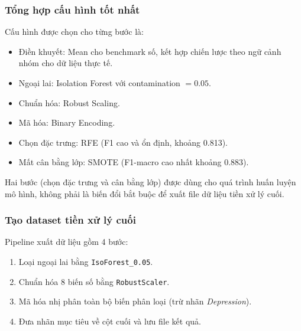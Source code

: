 \subsubsection{Tổng hợp cấu hình tốt nhất}
Cấu hình được chọn cho từng bước là:
\begin{itemize}
    \item Điền khuyết: Mean cho benchmark số, kết hợp chiến lược theo ngữ cảnh nhóm cho dữ liệu thực tế.
    \item Ngoại lai: Isolation Forest với contamination $=0.05$.
    \item Chuẩn hóa: Robust Scaling.
    \item Mã hóa: Binary Encoding.
    \item Chọn đặc trưng: RFE (F1 cao và ổn định, khoảng 0.813).
    \item Mất cân bằng lớp: SMOTE (F1-macro cao nhất khoảng 0.883).
\end{itemize}

Hai bước (chọn đặc trưng và cân bằng lớp) được dùng cho quá trình huấn luyện mô hình, không phải là biến đổi bắt buộc để xuất file dữ liệu tiền xử lý cuối.

\subsubsection{Tạo dataset tiền xử lý cuối}
Pipeline xuất dữ liệu gồm 4 bước:
\begin{enumerate}
    \item Loại ngoại lai bằng \texttt{IsoForest\_0.05}.
    \item Chuẩn hóa 8 biến số bằng \texttt{RobustScaler}.
    \item Mã hóa nhị phân toàn bộ biến phân loại (trừ nhãn \textit{Depression}).
    \item Đưa nhãn mục tiêu về cột cuối và lưu file kết quả.
\end{enumerate}


